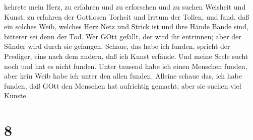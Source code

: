 kehrete mein Herz, zu erfahren und zu erforschen und zu suchen Weisheit
und Kunst, zu erfahren der Gottlosen Torheit und Irrtum der Tollen,
 und fand, daß ein solches Weib, welches Herz Netz und
Strick ist und ihre Hände Bande sind, bitterer sei denn der Tod. Wer
GOtt gefällt, der wird ihr entrinnen; aber der Sünder wird durch sie
gefangen.  Schaue, das habe ich funden, spricht der
Prediger, eins nach dem andern, daß ich Kunst erfände.  Und
meine Seele sucht noch und hat es nicht funden. Unter tausend habe ich
einen Menschen funden, aber kein Weib habe ich unter den allen funden.
 Alleine schaue das, ich habe funden, daß GOtt den Menschen
hat aufrichtig gemacht; aber sie suchen viel Künste.

\hypertarget{section-7}{%
\section{8}\label{section-7}}

